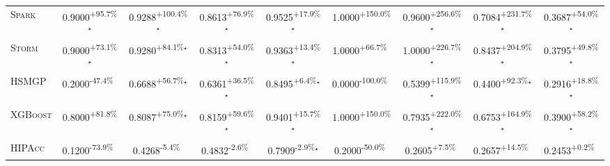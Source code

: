 \begin{table}[htbp]
\begin{tabular}{l|cccc|cccc}
\textsc{Spark} & \cellcolor{green!30}0.9000\textsuperscript{+95.7\%}$^\star$ & \cellcolor{green!30}0.9288\textsuperscript{+100.4\%}$^\star$ & \cellcolor{green!30}0.8613\textsuperscript{+76.9\%}$^\star$ & \cellcolor{green!30}0.9525\textsuperscript{+17.9\%}$^\star$ & \cellcolor{green!30}1.0000\textsuperscript{+150.0\%}$^{\,\,\,}$ & \cellcolor{green!30}0.9600\textsuperscript{+256.6\%}$^\star$ & \cellcolor{green!30}0.7084\textsuperscript{+231.7\%}$^\star$ & \cellcolor{green!30}0.3687\textsuperscript{+54.0\%}$^\star$ \\
\textsc{Storm} & \cellcolor{green!30}0.9000\textsuperscript{+73.1\%}$^\star$ & \cellcolor{green!30}0.9280\textsuperscript{+84.1\%}$^\star$ & \cellcolor{green!30}0.8313\textsuperscript{+54.0\%}$^\star$ & \cellcolor{green!30}0.9363\textsuperscript{+13.4\%}$^\star$ & \cellcolor{green!30}1.0000\textsuperscript{+66.7\%}$^{\,\,\,}$ & \cellcolor{green!30}1.0000\textsuperscript{+226.7\%}$^\star$ & \cellcolor{green!30}0.8437\textsuperscript{+204.9\%}$^\star$ & \cellcolor{green!30}0.3795\textsuperscript{+49.8\%}$^\star$ \\
\textsc{HSMGP} & \cellcolor{red!30}0.2000\textsuperscript{-47.4\%}$^{\,\,\,}$ & \cellcolor{green!30}0.6688\textsuperscript{+56.7\%}$^\star$ & \cellcolor{green!30}0.6361\textsuperscript{+36.5\%}$^\star$ & \cellcolor{green!30}0.8495\textsuperscript{+6.4\%}$^\star$ & \cellcolor{red!30}0.0000\textsuperscript{-100.0\%}$^{\,\,\,}$ & \cellcolor{green!30}0.5399\textsuperscript{+115.9\%}$^\star$ & \cellcolor{green!30}0.4400\textsuperscript{+92.3\%}$^\star$ & \cellcolor{green!30}0.2916\textsuperscript{+18.8\%}$^\star$ \\
\textsc{XGBoost} & \cellcolor{green!30}0.8000\textsuperscript{+81.8\%}$^{\,\,\,}$ & \cellcolor{green!30}0.8087\textsuperscript{+75.0\%}$^\star$ & \cellcolor{green!30}0.8159\textsuperscript{+59.6\%}$^\star$ & \cellcolor{green!30}0.9401\textsuperscript{+15.7\%}$^\star$ & \cellcolor{green!30}1.0000\textsuperscript{+150.0\%}$^{\,\,\,}$ & \cellcolor{green!30}0.7935\textsuperscript{+222.0\%}$^\star$ & \cellcolor{green!30}0.6753\textsuperscript{+164.9\%}$^\star$ & \cellcolor{green!30}0.3900\textsuperscript{+58.2\%}$^\star$ \\
\textsc{HIPAcc} & \cellcolor{red!30}0.1200\textsuperscript{-73.9\%}$^{\,\,\,}$ & \cellcolor{red!30}0.4268\textsuperscript{-5.4\%}$^{\,\,\,}$ & \cellcolor{red!30}0.4832\textsuperscript{-2.6\%}$^{\,\,\,}$ & \cellcolor{red!30}0.7909\textsuperscript{-2.9\%}$^\star$ & \cellcolor{red!30}0.2000\textsuperscript{-50.0\%}$^{\,\,\,}$ & \cellcolor{green!30}0.2605\textsuperscript{+7.5\%}$^{\,\,\,}$ & \cellcolor{green!30}0.2657\textsuperscript{+14.5\%}$^{\,\,\,}$ & \cellcolor{green!30}0.2453\textsuperscript{+0.2\%}$^{\,\,\,}$ \\

\end{tabular}
\end{table}
